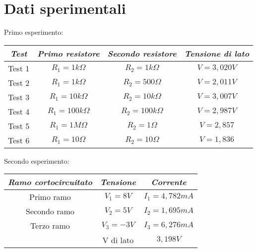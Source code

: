 
    \newpage

    \section{Dati sperimentali}
    \begin{center}
        Primo esperimento: \par
    \begin{tabular}{|c|c|c|c|}
        \hline
        \textit{Test} & \textit{Primo resistore} & \textit{Secondo resistore} & \textit{Tensione di lato} \\
        \hline
        Test 1 & $R_1 =1k\Omega$ & $R_2=1k\Omega$ & $V=3,020V$\\
        \hline
        Test 2 & $R_1 =1k\Omega$ & $R_2=500\Omega$ & $V=2,011V$\\
        \hline
        Test 3 & $R_1 =10k\Omega$ & $R_2=10k\Omega$ & $V=3,007V$\\
        \hline
        Test 4 & $R_1 =100k\Omega$ & $R_2=100k\Omega$ & $V=2,987V$\\
        \hline
        Test 5 & $R_1 =1M\Omega$ & $R_2=1\Omega$ & $V=2,857$\\
        \hline
        Test 6 & $R_1 =10\Omega$ & $R_2=10\Omega$ & $V=1,836$\\
        \hline
    
    \end{tabular}
    \end{center}
    
    \begin{center}
        Secondo esperimento: \par
    \begin{tabular}{|c|c|c|}
        \hline
        \textit{Ramo cortocircuitato} & \textit{Tensione} & \textit{Corrente} \\
        \hline
        Primo ramo & $V_1 = 8V$ & $I_1 = 4,782 mA$\\
        \hline
        Secondo ramo & $V_2 = 5V$ & $I_2 = 1,695 mA$\\
        \hline
        Terzo ramo & $V_3 = -3V$ & $I_3 = 6,276 mA$\\
        \hline
        & V di lato & $3,198 V$\\
        \hline
    
    \end{tabular}
    \end{center}


